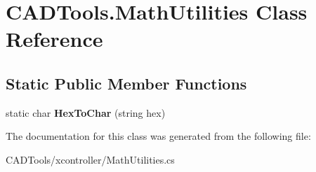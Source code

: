 \hypertarget{class_c_a_d_tools_1_1_math_utilities}{}\section{C\+A\+D\+Tools.\+Math\+Utilities Class Reference}
\label{class_c_a_d_tools_1_1_math_utilities}
\subsection*{Static Public Member Functions}
\begin{DoxyCompactItemize}
\item 
\mbox{\label{class_c_a_d_tools_1_1_math_utilities_a1e11bf7a3cd0a5502bd980b50f3645bc}} 
static char {\bfseries Hex\+To\+Char} (string hex)
\end{DoxyCompactItemize}


The documentation for this class was generated from the following file\+:\begin{DoxyCompactItemize}
\item 
C\+A\+D\+Tools/xcontroller/Math\+Utilities.\+cs\end{DoxyCompactItemize}
